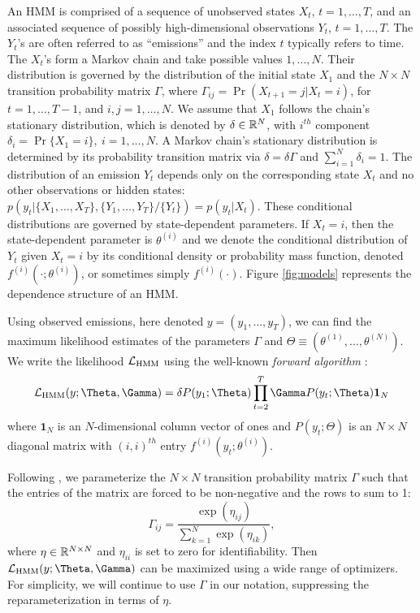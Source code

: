 An HMM is comprised of a sequence of unobserved states $X_t$, $t = 1, \ldots, T$, and an associated sequence of  possibly high-dimensional observations $Y_t$, $t = 1, \ldots, T$.
The $Y_t$'s are often referred to as ``emissions'' and the index $t$ typically refers to time. 
The $X_t$'s form a Markov chain and take possible values $1, \ldots, N$. Their distribution is governed by the distribution of the initial state $X_1$ and the $N \times N$ transition probability matrix $\Gamma$, where $\Gamma_{ij} = \Pr(X_{t+1} = j | X_t = i)$, for $t=1,\ldots, T-1$, and $i, j = 1,\ldots, N$. 
%
We assume that $X_1$ follows the chain's stationary distribution, which is denoted by $\delta \in \mathbb{R}^N$, with $i^{th}$ component
$\delta_i = \Pr\{X_1 = i\},~ i = 1,\ldots,N.$
A Markov chain's stationary distribution is determined by its probability transition matrix via $\delta = \delta \Gamma$ and $\sum_{i=1}^N \delta_i = 1$.
%
The distribution of an emission $Y_t$ depends only on the corresponding state $X_t$ and no other observations or hidden states: $p\left(y_t|\{X_1,\ldots, X_T\},\{Y_1,\ldots, Y_T\}/ \{Y_t\}\right) = p(y_t|X_t)$.
%
These conditional distributions are governed by state-dependent parameters. If $X_t = i$, then the state-dependent parameter is $\theta^{(i)}$ and we denote the conditional distribution of $Y_t$ given $X_t=i$ by its conditional density or probability mass function, denoted $f^{(i)}(\cdot ; \theta^{(i)})$, or sometimes simply $f^{(i)}(\cdot)$.
%
Figure \ref{fig:models} represents the dependence structure of an HMM.

Using observed emissions, here denoted $y = (y_1,\ldots,y_T)$, we can find the maximum likelihood estimates of the parameters $\Gamma$ and $\Theta \equiv (\theta^{(1)},\ldots,\theta^{(N)})$. We write the likelihood $\mathcal{L}_{\text{HMM}}$ using the  well-known \textit{forward algorithm} \citep{Zucchini:2016}:
%
$$\calL_{\text{HMM}}(y;\Theta,\Gamma) = \delta P(y_1;\Theta) \prod_{t=2}^T \Gamma P(y_t;\Theta) \mathbf{1}_N$$
%
where $\mathbf{1}_N$ is an $N$-dimensional column vector of ones and
%
$P(y_t;\Theta)$ is an $N \times N$ diagonal matrix with $(i,i)^{th}$ entry  $f^{(i)}(y_t; \theta^{(i)})$.
%

Following \citet{Barajas:2017}, we parameterize the $N \times N$ transition probability matrix $\Gamma$ such that the entries of the matrix are forced to be non-negative and the rows to sum to 1:
%
\[
\Gamma_{ij} = \frac{\exp(\eta_{ij})}{\sum_{k=1}^N \exp(\eta_{ik})}, 
\]
%
where $\eta \in \mathbb{R}^{N \times N}$ and $\eta_{ii}$ is set to zero for identifiability.  Then $\calL_{\text{HMM}}(y;\Theta,\Gamma)$ can be maximized using a wide range of optimizers.  For simplicity, we will continue to use $\Gamma$ in our notation, suppressing the reparameterization in terms of  $\eta$.


